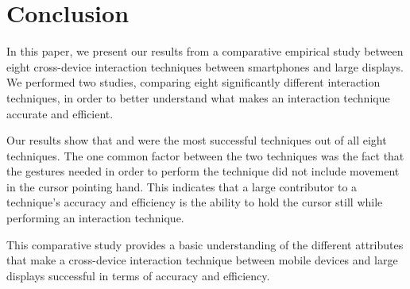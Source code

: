 \section{Conclusion}\label{sec:conclusion}
In this paper, we present our results from a comparative empirical study between eight cross-device interaction techniques between smartphones and large displays. 
We performed two studies, comparing eight significantly different interaction techniques, in order to better understand what makes an interaction technique accurate and efficient. 

Our results show that \swipe and \throw were the most successful techniques out of all eight techniques. 
The one common factor between the two techniques was the fact that the gestures needed in order to perform the technique did not include movement in the cursor pointing hand.
This indicates that a large contributor to a technique's accuracy and efficiency is the ability to hold the cursor still while performing an interaction technique.

This comparative study provides a basic understanding of the different attributes that make a cross-device interaction technique between mobile devices and large displays successful in terms of accuracy and efficiency. 